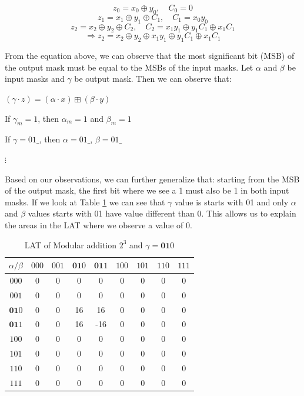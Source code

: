 \documentclass[runningheads]{llncs}
\begin{document}
\[
z_0 = x_0 \oplus y_0, \quad C_0 = 0
\]
\[
z_1 = x_1 \oplus y_1 \oplus C_1, \quad C_1 = x_0 y_0
\]
\[
z_2 = x_2 \oplus y_2 \oplus C_2, \quad C_2 = x_1 y_1 \oplus y_1 C_1 \oplus x_1 C_1
\]
\[
\Rightarrow z_2 = x_2 \oplus y_2 \oplus x_1 y_1 \oplus y_1 C_1 \oplus x_1 C_1
\]

From the equation above, we can observe that the most significant bit (MSB) of the output mask must be equal to the MSBs of the input masks. Let $\alpha$ and $\beta$ be input masks and $\gamma$ be output mask. Then we can observe that:

\begin{center}
    \( (\gamma \cdot z) = (\alpha \cdot x) \boxplus (\beta \cdot y) \)
\end{center}

\begin{center}
    If \( \gamma_m = 1 \), then \( \alpha_m = 1 \) and \( \beta_m = 1 \)

    If \( \gamma = 01\_ \), then \( \alpha = 01\_ \), \( \beta = 01\_ \)

    \( \vdots \)
\end{center}

Based on our observations, we can further generalize that: starting from the MSB of the output mask, the first bit where we see a 1 must also be 1 in both input masks. If we look at Table \ref{tab:LAT010} we can see that $\gamma$ value is starts with 01 and only $\alpha$ and $\beta$ values starts with 01 have value different than 0. This allows us to explain the areas in the LAT where we observe a value of 0.

\begin{table}[]
    \centering
    \begin{tabular}{c|cccccccc}
    $ \alpha / \beta $ & $000$ & $001$ & $\textbf{01}0$ & $\textbf{01}1$ & $100$ & $101$ & $110$ & $111$  \\
    \midrule
    $000$ & 0 & 0 & 0 & 0 & 0 & 0 & 0 & 0  \\
    $001$ & 0 & 0 & 0 & 0 & 0 & 0 & 0 & 0  \\
    $\textbf{01}0$ & 0 & 0 & 16 & 16 & 0 & 0 & 0 & 0  \\
    $\textbf{01}1$ & 0 & 0 & 16 & -16 & 0 & 0 & 0 & 0  \\
    $100$ & 0 & 0 & 0 & 0 & 0 & 0 & 0 & 0  \\
    $101$ & 0 & 0 & 0 & 0 & 0 & 0 & 0 & 0  \\
    $110$ & 0 & 0 & 0 & 0 & 0 & 0 & 0 & 0  \\
    $111$ & 0 & 0 & 0 & 0 & 0 & 0 & 0 & 0  \\
    \end{tabular}
    \caption{LAT of Modular addition $2^3$ and $\gamma = \textbf{01}0$}
    \label{tab:LAT010}
\end{table}
\end{document}
